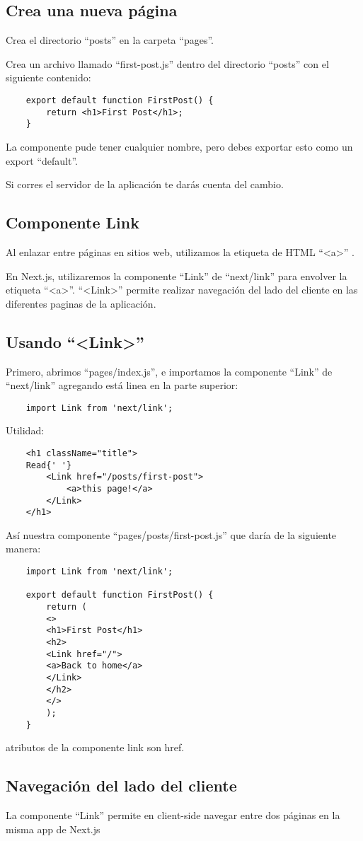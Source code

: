 \subsection{Crea una nueva p\'agina}
Crea el directorio ``posts'' en la carpeta ``pages''.

Crea un archivo llamado ``first-post.js'' dentro del directorio ``posts'' con el siguiente contenido: 
\begin{verbatim}
	export default function FirstPost() {
		return <h1>First Post</h1>;
	}
\end{verbatim}
La componente pude tener cualquier nombre, pero debes exportar esto como un export ``default''.

Si corres el servidor de la aplicaci\'on te dar\'as cuenta del cambio. 
\subsection{Componente Link}

Al enlazar entre p\'aginas en sitios web, utilizamos la etiqueta de HTML ``<a>'' . 

En Next.js, utilizaremos la componente ``Link'' de ``next/link'' para envolver la etiqueta ``<a>''. ``<Link>'' permite realizar navegaci\'on del lado del cliente en las diferentes paginas de la aplicaci\'on. 

\subsection{Usando ``<Link>''}
Primero, abrimos ``pages/index.js'', e importamos la componente ``Link'' de ``next/link'' agregando est\'a linea en la parte superior: 
\begin{verbatim}
	import Link from 'next/link';
\end{verbatim}

Utilidad: 

\begin{verbatim}
	<h1 className="title">
	Read{' '}
		<Link href="/posts/first-post">
			<a>this page!</a>
		</Link>
	</h1>
\end{verbatim}

As\'i nuestra componente ``pages/posts/first-post.js'' que dar\'ia de la siguiente manera: 

\begin{verbatim}
	import Link from 'next/link';
	
	export default function FirstPost() {
		return (
		<>
		<h1>First Post</h1>
		<h2>
		<Link href="/">
		<a>Back to home</a>
		</Link>
		</h2>
		</>
		);
	}
\end{verbatim}

atributos de la componente link son href.

\subsection{Navegaci\'on del lado del cliente}

La componente ``Link'' permite en client-side navegar entre dos p\'aginas en la misma app de Next.js 

